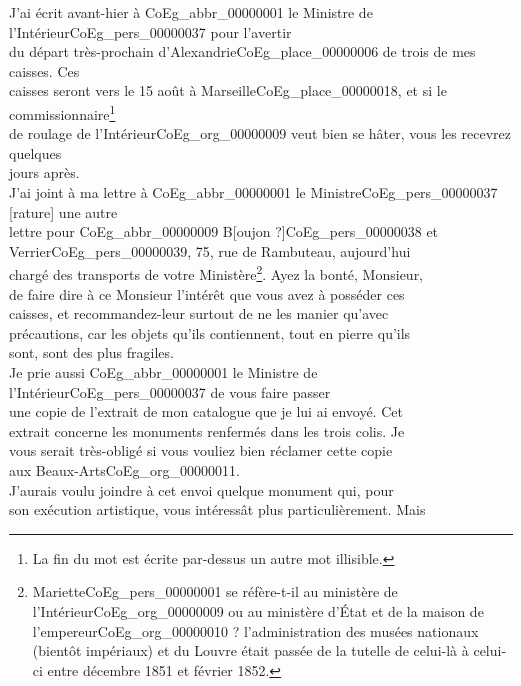 \documentclass{book}
\begin{document}
\indent J’ai écrit avant-hier à \gls{CoEg_abbr_00000001} le Ministre de l’Intérieur\gls{CoEg_pers_00000037} pour l’avertir\\
du départ très-prochain d’Alexandrie\gls{CoEg_place_00000006} de trois de mes caisses. Ces\\
caisses seront vers le 15 août à Marseille\gls{CoEg_place_00000018}, et si le commissionnaire\footnote{La fin du mot est écrite par-dessus un autre mot illisible.}\\
de roulage de l’Intérieur\gls{CoEg_org_00000009} veut bien se hâter, vous les recevrez quelques\\
jours après.\\
\indent J’ai joint à ma lettre à \gls{CoEg_abbr_00000001} le Ministre\gls{CoEg_pers_00000037} [rature] une autre\\
lettre pour \gls{CoEg_abbr_00000009} B{[oujon ?]}\gls{CoEg_pers_00000038} et Verrier\gls{CoEg_pers_00000039}, 75, rue de Rambuteau, aujourd’hui\\
chargé des transports de votre Ministère\footnote{Mariette\gls{CoEg_pers_00000001} se réfère-t-il au ministère de l'Intérieur\gls{CoEg_org_00000009} ou au ministère d'État et de la maison de l'empereur\gls{CoEg_org_00000010} ? l'administration des musées nationaux (bientôt impériaux) et du Louvre était passée de la tutelle de celui-là à celui-ci entre décembre 1851 et février 1852.}. Ayez la bonté, Monsieur,\\
de faire dire à ce Monsieur l’intérêt que vous avez à posséder ces\\
caisses, et recommandez-leur surtout de ne les manier qu’avec\\
précautions, car les objets qu’ils contiennent, tout en pierre qu’ils\\
sont, sont des plus fragiles.\\
\indent Je prie aussi \gls{CoEg_abbr_00000001} le Ministre de l’Intérieur\gls{CoEg_pers_00000037} de vous faire passer\\
une copie de l’extrait de mon catalogue que je lui ai envoyé. Cet\\
extrait concerne les monuments renfermés dans les trois colis. Je\\
vous serait très-obligé si vous vouliez bien réclamer cette copie\\
aux Beaux-Arts\gls{CoEg_org_00000011}.\\
\indent J’aurais voulu joindre à cet envoi quelque monument qui, pour\\
son exécution artistique, vous intéressât plus particulièrement. Mais\\
\end{document}
